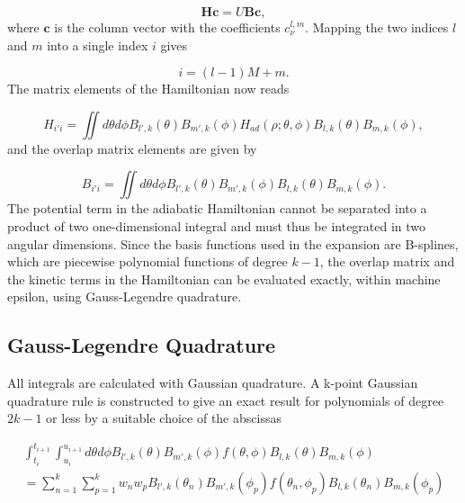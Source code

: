 \begin{equation}\label{generalized}
\mathbf{H}\mathbf{c} = U\mathbf{B}\mathbf{c},
\end{equation}
where $\mathbf{c}$ is the column vector with the coefficients $c_{\nu}^{l,m}$. Mapping the two indices $l$ and $m$ into a single index $i$ gives 

\begin{equation}
i=(l-1)M+m.
\end{equation} 
The matrix elements of the Hamiltonian now reads

\begin{equation}\label{ham_mat}
H_{i'i} = \iint d\theta d\phi B_{l',k}(\theta)B_{m',k}(\phi)H_{ad}(\rho;\theta,\phi)B_{l,k}(\theta)B_{m,k}(\phi),
\end{equation}
and the overlap matrix elements are given by

\begin{equation}\label{over_mat}
B_{i'i} = \iint d\theta d\phi B_{l',k}(\theta)B_{m',k}(\phi)B_{l,k}(\theta)B_{m,k}(\phi).
\end{equation}
The potential term in the adiabatic Hamiltonian cannot be separated into a product of two one-dimensional integral and must thus be integrated in two angular dimensions. Since the basis functions used in the expansion are B-splines, which are piecewise polynomial functions of degree $k-1$, the overlap matrix and the kinetic terms in the Hamiltonian can be evaluated exactly, within machine epsilon, using Gauss-Legendre quadrature.  

\subsection{Gauss-Legendre Quadrature}
All integrals are calculated with Gaussian quadrature. A k-point Gaussian quadrature rule is constructed to give an exact result for polynomials of degree $2k-1$ or less by a suitable choice of the abscissas

\begin{align}
\int_{t_{i}}^{t_{i+1}} \int_{u_{i}}^{u_{i+1}} d\theta d\phi B_{l',k}(\theta)B_{m',k}(\phi)f(\theta,\phi)B_{l,k}(\theta)B_{m,k}(\phi)\nonumber\\
=\sum_{n=1}^{k} \sum_{p=1}^{k}w_n w_p B_{l',k}(\theta_n)B_{m',k}(\phi_p)f(\theta_n,\phi_p)B_{l,k}(\theta_n)B_{m,k}(\phi_p)
\end{align}